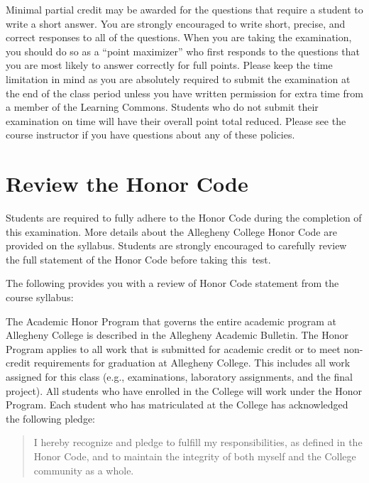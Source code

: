 \vspace*{-.05in}
\noindent Minimal partial credit may be awarded for the questions that require a student to write a short answer. You
are strongly encouraged to write short, precise, and correct responses to all of the questions. When you are taking the
examination, you should do so as a ``point maximizer'' who first responds to the questions that you are most likely to
answer correctly for full points. Please keep the time limitation in mind as you are absolutely required to submit the
examination at the end of the class period unless you have written permission for extra time from a member of the
Learning Commons. Students who do not submit their examination on time will have their overall point total reduced.
Please see the course instructor if you have questions about any of these policies.

\vspace*{-.1in}
\section*{Review the Honor Code}
\vspace*{-.06in}

\noindent Students are required to fully adhere to the Honor Code during the completion of this examination. More
details about the Allegheny College Honor Code are provided on the syllabus. Students are strongly encouraged to
carefully review the full statement of the Honor Code before taking \mbox{this test}.

\noindent The following provides you with a review of Honor Code statement from the course syllabus:

The Academic Honor Program that governs the entire academic program at Allegheny College is described in the Allegheny
Academic Bulletin.  The Honor Program applies to all work that is submitted for academic credit or to meet non-credit
requirements for graduation at Allegheny College.  This includes all work assigned for this class (e.g., examinations,
laboratory assignments, and the final project).  All students who have enrolled in the College will work under the Honor
Program.  Each student who has matriculated at the College has acknowledged the following pledge:

\vspace*{-.11in}
\begin{quote}
  I hereby recognize and pledge to fulfill my responsibilities, as defined in the Honor Code, and to maintain the
  integrity of both myself and the College community as a whole.
\end{quote}
\vspace*{-.11in}

